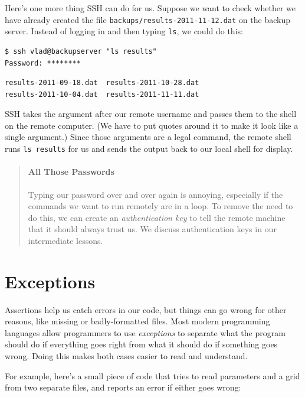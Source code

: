 \documentclass[]{book}
\newcommand{\gdef}[2]{\emph{#2}}
\begin{document}
Here's one more thing SSH can do for us. Suppose we want to check
whether we have already created the file
\texttt{backups/results-2011-11-12.dat} on the backup server. Instead of
logging in and then typing \texttt{ls}, we could do this:

\begin{verbatim}
$ ssh vlad@backupserver "ls results"
Password: ********
\end{verbatim}

\begin{verbatim}
results-2011-09-18.dat  results-2011-10-28.dat
results-2011-10-04.dat  results-2011-11-11.dat
\end{verbatim}

SSH takes the argument after our remote username and passes them to the
shell on the remote computer. (We have to put quotes around it to make
it look like a single argument.) Since those arguments are a legal
command, the remote shell runs \texttt{ls results} for us and sends the
output back to our local shell for display.

\begin{quote}
\mbox{}\paragraph{All Those Passwords}

Typing our password over and over again is annoying, especially if the
commands we want to run remotely are in a loop. To remove the need to do
this, we can create an \gdef{g:authentication-key}{authentication
key} to tell the remote machine that it should always trust us. We
discuss authentication keys in our intermediate lessons.
\end{quote}

\section{Exceptions}

Assertions help us catch errors in our code, but things can go wrong for
other reasons, like missing or badly-formatted files. Most modern
programming languages allow programmers to use
\gdef{g:exception}{exceptions} to separate what the program should
do if everything goes right from what it should do if something goes
wrong. Doing this makes both cases easier to read and understand.

For example, here's a small piece of code that tries to read parameters
and a grid from two separate files, and reports an error if either goes
wrong:
\end{document}
